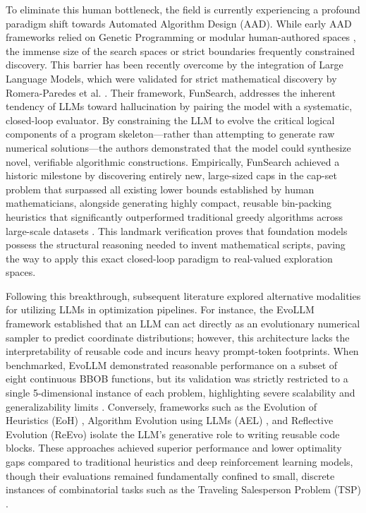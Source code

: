 To eliminate this human bottleneck, the field is currently experiencing a profound paradigm shift towards Automated Algorithm Design (AAD). While early AAD frameworks relied on Genetic Programming \cite{Burke2013} or modular human-authored spaces \cite{vanRijn2016}, the immense size of the search spaces or strict boundaries frequently constrained discovery. This barrier has been recently overcome by the integration of Large Language Models, which were validated for strict mathematical discovery by Romera-Paredes et al. \cite{Romera2023}. Their framework, FunSearch, addresses the inherent tendency of LLMs toward hallucination by pairing the model with a systematic, closed-loop evaluator. By constraining the LLM to evolve the critical logical components of a program skeleton—rather than attempting to generate raw numerical solutions—the authors demonstrated that the model could synthesize novel, verifiable algorithmic constructions. Empirically, FunSearch achieved a historic milestone by discovering entirely new, large-sized caps in the cap-set problem that surpassed all existing lower bounds established by human mathematicians, alongside generating highly compact, reusable bin-packing heuristics that significantly outperformed traditional greedy algorithms across large-scale datasets \cite{Romera2023}. This landmark verification proves that foundation models possess the structural reasoning needed to invent mathematical scripts, paving the way to apply this exact closed-loop paradigm to real-valued exploration spaces.

Following this breakthrough, subsequent literature explored alternative modalities for utilizing LLMs in optimization pipelines. For instance, the EvoLLM framework \cite{Lange2024} established that an LLM can act directly as an evolutionary numerical sampler to predict coordinate distributions; however, this architecture lacks the interpretability of reusable code and incurs heavy prompt-token footprints. When benchmarked, EvoLLM demonstrated reasonable performance on a subset of eight continuous BBOB functions, but its validation was strictly restricted to a single 5-dimensional instance of each problem, highlighting severe scalability and generalizability limits \cite{Lange2024}. Conversely, frameworks such as the Evolution of Heuristics (EoH) \cite{Liu2024}, Algorithm Evolution using LLMs (AEL) \cite{AEL2024}, and Reflective Evolution (ReEvo) \cite{ReEvo2024} isolate the LLM's generative role to writing reusable code blocks. These approaches achieved superior performance and lower optimality gaps compared to traditional heuristics and deep reinforcement learning models, though their evaluations remained fundamentally confined to small, discrete instances of combinatorial tasks such as the Traveling Salesperson Problem (TSP) \cite{AEL2024, Liu2024}. 

